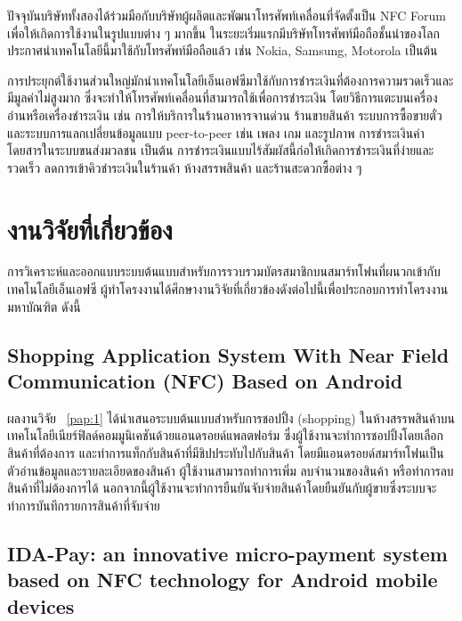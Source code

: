 \documentclass[a4paper]{article}
\begin{document}
ปัจจุบันบริษัททั้งสองได้ร่วมมือกับบริษัทผู้ผลิตและพัฒนาโทรศัพท์เคลื่อนที่จัดตั้งเป็น NFC Forum เพื่อให้เกิดการใช้งานในรูปแบบต่าง ๆ มากขึ้น ในระยะเริ่มแรกมีบริษัทโทรศัพท์มือถือชั้นนำของโลกประกาศนำเทคโนโลยีนี้มาใช้กับโทรศัพท์มือถือแล้ว เช่น Nokia, Samsung, Motorola เป็นต้น

การประยุกต์ใช้งานส่วนใหญ่มักนำเทคโนโลยีเอ็นเอฟซีมาใช้กับการชำระเงินที่ต้องการความรวดเร็วและมีมูลค่าไม่สูงมาก ซึ่งจะทำให้โทรศัพท์เคลื่อนที่สามารถใช้เพื่อการชำระเงิน โดยวิธีการแตะบนเครื่องอ่านหรือเครื่องชำระเงิน เช่น การให้บริการในร้านอาหารจานด่วน ร้านขายสินค้า ระบบการซื้อขายตั๋ว และระบบการแลกเปลี่ยนข้อมูลแบบ peer-to-peer เช่น เพลง เกม และรูปภาพ การชำระเงินค่าโดยสารในระบบขนส่งมวลชน เป็นต้น การชำระเงินแบบไร้สัมผัสนี้ก่อให้เกิดการชำระเงินที่ง่ายและรวดเร็ว ลดการเข้าคิวชำระเงินในร้านค้า ห้างสรรพสินค้า และร้านสะดวกซื้อต่าง ๆ


\section{งานวิจัยที่เกี่ยวข้อง}

การวิเคราะห์และออกแบบระบบต้นแบบสำหรับการรวบรวมบัตรสมาชิกบนสมาร์ทโฟนที่ผนวกเข้ากับเทคโนโลยีเอ็นเอฟซี ผู้ทำโครงงานได้ศึกษางานวิจัยที่เกี่ยวข้องดังต่อไปนี้เพื่อประกอบการทําโครงงานมหาบัณฑิต ดังนี้

\subsection{Shopping Application System With Near Field Communication (NFC) Based on Android}

ผลงานวิจัย ~\ref{pap:1}  ได้นำเสนอระบบต้นแบบสำหรับการชอปปิ้ง (shopping) ในห้างสรรพสินค้าบนเทคโนโลยีเนียร์ฟิลด์คอมมูนิเคชันด้วยแอนดรอยด์แพลตฟอร์ม ซึ่งผู้ใช้งานจะทำการชอปปิ้งโดยเลือกสินค้าที่ต้องการ และทำการแท็กกับสินค้าที่มีชิปประทับไปกับสินค้า โดยมีแอนดรอยด์สมาร์ทโฟนเป็นตัวอ่านข้อมูลและรายละเอียดของสินค้า ผู้ใช้งานสามารถทำการเพิ่ม ลบจำนวนของสินค้า หรือทำการลบสินค้าที่ไม่ต้องการได้ นอกจากนี้ผู้ใช้งานจะทำการยืนยันจับจ่ายสินค้าโดยยืนยันกับผู้ขายซึ่งระบบจะทำการบันทึกรายการสินค้าที่จับจ่าย

\subsection{IDA-Pay: an innovative micro-payment system based on NFC technology for Android mobile devices}
\end{document}
